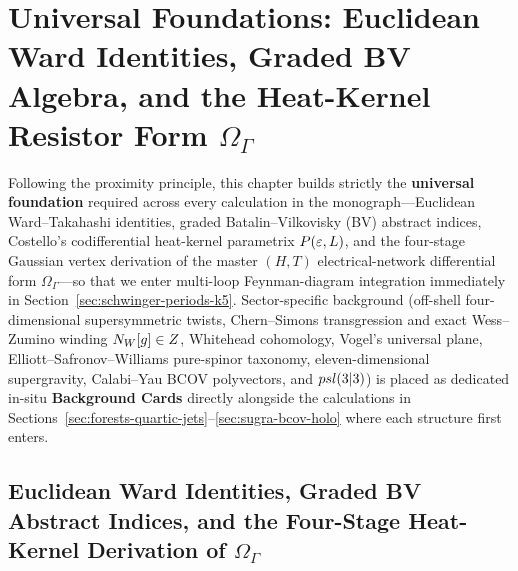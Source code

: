 \section{Universal Foundations: Euclidean Ward Identities, Graded BV Algebra, and the Heat-Kernel Resistor Form \texorpdfstring{$\Omega_\Gamma$}{Omega\_Gamma}}
\label{sec:ward-bv-primer}

Following the proximity principle, this chapter builds strictly the \textbf{universal foundation} required across every calculation in the monograph---Euclidean Ward--Takahashi identities, graded Batalin--Vilkovisky (BV) abstract indices, Costello's codifferential heat-kernel parametrix $P(\varepsilon,L)$, and the four-stage Gaussian vertex derivation of the master $(H,T)$ electrical-network differential form $\Omega_\Gamma$---so that we enter multi-loop Feynman-diagram integration immediately in Section~\ref{sec:schwinger-periods-k5}. Sector-specific background (off-shell four-dimensional supersymmetric twists, Chern--Simons transgression and exact Wess--Zumino winding $N_W[g]\in Z$, Whitehead cohomology, Vogel's universal plane, Elliott--Safronov--Williams pure-spinor taxonomy, eleven-dimensional supergravity, Calabi--Yau BCOV polyvectors, and $psl(3|3)$) is placed as dedicated in-situ \textbf{Background Cards} directly alongside the calculations in Sections~\ref{sec:forests-quartic-jets}--\ref{sec:sugra-bcov-holo} where each structure first enters.

\subsection{Euclidean Ward Identities, Graded BV Abstract Indices, and the Four-Stage Heat-Kernel Derivation of \texorpdfstring{$\Omega_\Gamma$}{Omega\_Gamma}}
\label{subsec:bv-graded-module}

